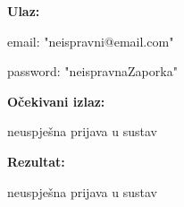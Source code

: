 			\noindent {}
			 \begin{packed_item}

				 \item \textbf{Ulaz:}

				 \item[] \begin{packed_enum}
					\item email: "neispravni@email.com"
					\item password: "neispravnaZaporka"
				\end{packed_enum}

				  \item \textbf{Očekivani izlaz:}

				 \item[] \begin{packed_enum}
					\item neuspješna prijava u sustav
				\end{packed_enum}
				 
				\item \textbf{Rezultat:}

				\item[] \begin{packed_enum}
					\item neuspješna prijava u sustav
			   \end{packed_enum}

			 \end{packed_item}
